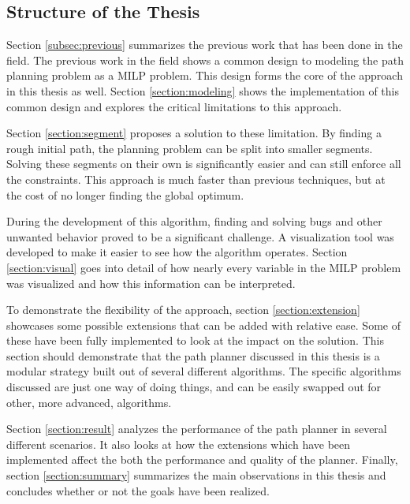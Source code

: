 \documentclass[12pt]{article}
\begin{document}
\subsection{Structure of the Thesis}
Section \ref{subsec:previous} summarizes the previous work that has been done in the field.
The previous work in the field shows a common design to modeling the path planning problem as a MILP problem. This design forms the core of the approach in this thesis as well. Section \ref{section:modeling} shows the implementation of this common design and explores the critical limitations to this approach.
\par
Section \ref{section:segment} proposes a solution to these limitation. By finding a rough initial path, the planning problem can be split into smaller segments. Solving these segments on their own is significantly easier and can still enforce all the constraints. This approach is much faster than previous techniques, but at the cost of no longer finding the global optimum.
\par
During the development of this algorithm, finding and solving bugs and other unwanted behavior proved to be a significant challenge. A visualization tool was developed to make it easier to see how the algorithm operates. Section \ref{section:visual} goes into detail of how nearly every variable in the MILP problem was visualized and how this information can be interpreted.
\par
To demonstrate the flexibility of the approach, section \ref{section:extension} showcases some possible extensions that can be added with relative ease. Some of these have been fully implemented to look at the impact on the solution. This section should demonstrate that the path planner discussed in this thesis is a modular strategy built out of several different algorithms. The specific algorithms discussed are just one way of doing things, and can be easily swapped out for other, more advanced, algorithms. 
\par
Section \ref{section:result} analyzes the performance of the path planner in several different scenarios. It also looks at how the extensions which have been implemented affect the both the performance and quality of the planner.
Finally, section \ref{section:summary} summarizes the main observations in this thesis and concludes whether or not the goals have been realized.
\end{document}
